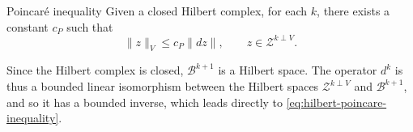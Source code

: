 \begin{Theorem}{Poincaré {inequality}}\label{thm:hilbert-complex-poincare}
{Given a closed Hilbert complex, for each $k$, there exists a constant $c_P$ such that}
\begin{equation}\label{eq:hilbert-poincare-inequality}
\|z\|_V\leq c_P\|dz\|,\qquad z\in\mathcal Z^{k\perp V}.
\end{equation}
\end{Theorem}

\begin{Proof}
{Since the Hilbert complex is closed, $\mathcal B^{k+1}$ is a Hilbert space. The operator $d^k$ is thus a bounded linear isomorphism between the Hilbert spaces $\mathcal Z^{k\perp V}$ and $\mathcal B^{k+1}$, and so it has a bounded inverse, which leads directly to \eqref{eq:hilbert-poincare-inequality}.}
\end{Proof}
